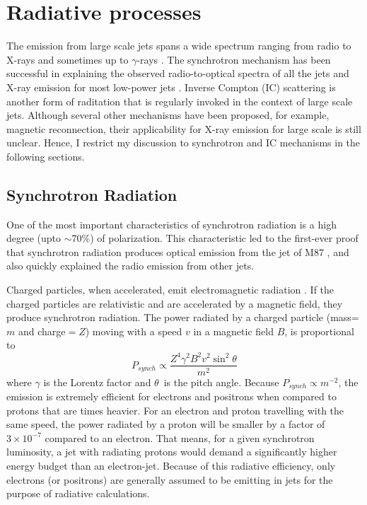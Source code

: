 \section{Radiative processes \label{sec:radative_processes}}
The emission from large scale jets spans a wide spectrum ranging from radio to X-rays \citep[e.g., ][]{harris2002x,worrall2009x} and sometimes up to $\gamma$-rays \citep[e.g.,][]{Meyer_2019,2020Natur.582..356H}. The synchrotron mechanism has been successful in explaining the observed radio-to-optical spectra of all the jets and X-ray emission for most low-power jets \citep[e.g.,][]{2001MNRAS.326.1499H,marshall2002}. Inverse Compton (IC) scattering is another form of raditation that is regularly invoked in the context of large scale jets. Although several other mechanisms have been proposed, for example, magnetic reconnection, their applicability for X-ray emission for large scale is still unclear. Hence, I restrict my discussion to synchrotron and IC mechanisms in the following sections.


\subsection{Synchrotron Radiation}
One of the most important characteristics of synchrotron radiation is a high degree (upto $\sim$70\%) of polarization.  This characteristic led to the first-ever proof that synchrotron radiation produces optical emission from the jet of M87 \citep{baade1956polarization}, and also quickly explained the radio emission from other jets.

 Charged particles, when accelerated, emit electromagnetic radiation  \cite[for a review, see][]{longair_2011}. If the charged particles are relativistic and are accelerated by a magnetic field, they produce synchrotron radiation.  The  power radiated by a charged particle (mass=$m$ and charge$=Z$) moving with a speed $v$ in a magnetic field $B$, is proportional to 
\begin{equation}
      P_{synch} \propto \frac{Z^4\gamma^2B^2v^2 \sin^2\theta}{m^2}
\end{equation}
 where $\gamma$ is the Lorentz factor and $\theta$~is the pitch angle.  Because $P_{synch}\propto m^{-2}$, the emission is extremely efficient for electrons and positrons when compared to protons that are  times heavier. For an electron and proton travelling with the same speed, the power radiated by a proton will be smaller by a factor of $3\times10^{-7}$ compared to an electron. That means, for a given synchrotron luminosity, a jet with radiating protons would demand a significantly higher energy budget than an electron-jet. Because of this radiative efficiency, only electrons (or positrons) are generally assumed to be emitting in jets for the purpose of radiative calculations.
 
